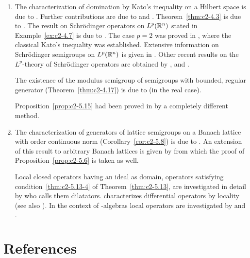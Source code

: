 \begin{enumerate}[label=\emph{Section 2.\arabic*:}, wide]
\item  The characterization of domination by Kato's inequality on a Hilbert space is due to \textcite{simon:1977}. Further contributions are due to \textcite{hessetal:1977} and \textcite{kishimotorobinson:1980}. Theorem~\ref{thm:c2-4.3} is due to \textcite{arendt:1984b}. The result on Schrödinger operators on $L^p(\mathbb{R}^n)$ stated in Example~\ref{ex:c2-4.7} is due to \textcite{kato:1986}. The case $p = 2$ was proved in \textcite{kato:1973}, where the classical Kato's inequality was established. Extensive information on Schrödinger semigroups on $L^p(\mathbb{R}^n)$ is given in \textcite{simon:1982}. Other recent results on the $L^p$-theory of Schrödinger operators are obtained by \textcite{davies:1986}, \textcite{okazawa:1984} and \textcite{voigt:1984a}.

The existence of the modulus semigroup of semigroups with bounded, regular generator (Theorem~\ref{thm:c2-4.17}) is due to \textcite{derndinger:1984} (in the real case).

Proposition~\ref{prop:c2-5.15}   had been proved in \textcite{schaeferetal:1978} by a completely different method.
 
\item  
The characterization of generators of lattice semigroups on a Banach lattice with order continuous norm (Corollary~\ref{cor:c2-5.8}) is due to \textcite{nageluhlig:1981}. An extension of this result to arbitrary Banach lattices is given by \textcite{arendt:1982} from which the proof of  Proposition~\ref{prop:c2-5.6}   is taken as well.

Local closed operators having an ideal as domain, \ie operators satisfying condition~\ref{thm:c2-5.13-4} of Theorem~\ref{thm:c2-5.13}, are investigated in detail by \textcite{nakano:1950} who calls them dilatators. \textcite{peetre:1959} characterizes differential operators by locality (see also \textcite{luxemburg:1979}). In the context of \CA-algebras local operators are investigated by \textcite{battyrobinson:1984} and \textcite{battyrobinson:1985}.

\end{enumerate}
\section*{References}
{\RaggedRight
  \printbibliography[heading=none]
 }
